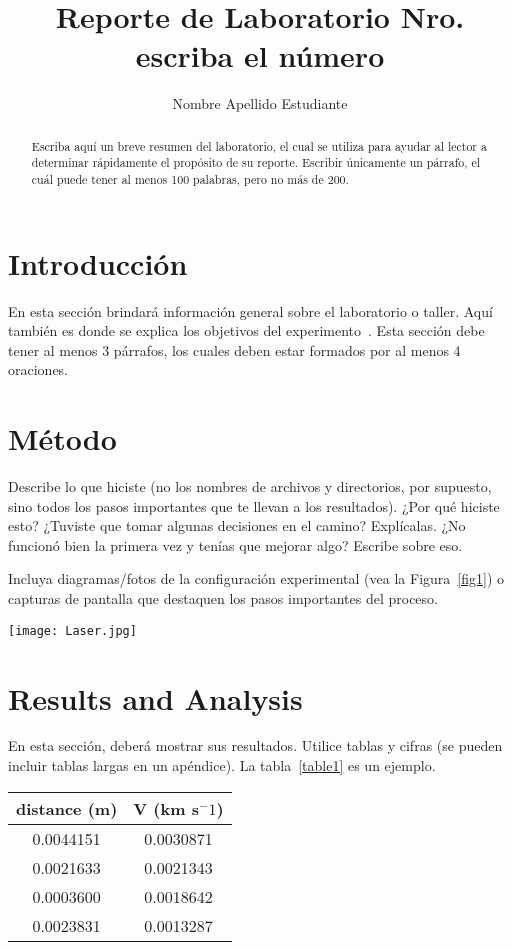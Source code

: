 \documentclass[10pt, oneside,spanish]{article}   	%
\title{Reporte de Laboratorio Nro. escriba el número}
\author[IDEstudiante]{Nombre Apellido Estudiante}
\affil[ ]{Universidad de las Fuerzas Armadas}
\affil[ ]{email@dominio.ec}
\affil[ ]{}
\affil[ ]{Tema: Tema de Laboratorio}
\date{}							%
\begin{document}
\maketitle

\begin{abstract}
Escriba aquí un breve resumen del laboratorio, el cual se utiliza para ayudar al lector a determinar rápidamente el propósito de su reporte. Escribir únicamente un párrafo, el cuál puede tener al menos 100 palabras, pero no más de 200.
\end{abstract}

\section{Introducción}
En esta sección brindará información general sobre el laboratorio o taller. Aquí también es donde se explica los objetivos del experimento~\cite{fest1959}. Esta sección debe tener al menos 3 párrafos, los cuales deben estar formados por al menos 4 oraciones.

\section {Método}
Describe lo que hiciste (no los nombres de archivos y directorios, por supuesto, sino todos los pasos importantes que te llevan a los resultados). ¿Por qué hiciste esto? ¿Tuviste que tomar algunas decisiones en el camino? Explícalas. ¿No funcionó bien la primera vez y tenías que mejorar algo? Escribe sobre eso.

Incluya diagramas/fotos de la configuración experimental (vea la Figura~\ref{fig1}) o capturas de pantalla que destaquen los pasos importantes del proceso.

\begin{figure*}[!ht] 
        \centering \texttt{[image: Laser.jpg]}
        \caption{\label{fig1}Every figure MUST have a caption~\cite{fest1959}.
        }
\end{figure*}

\section{Results and Analysis}
En esta sección, deberá mostrar sus resultados. Utilice tablas y cifras (se pueden incluir tablas largas en un apéndice). La tabla~\ref{table1} es un ejemplo.

\begin{table*}[ht]
\begin{center}
\caption{Cada tabla necesita una leyenda.}
\label{table1} 
\begin{tabular}{cc} 
\hline
\multicolumn{1}{c}{distance (m)} & \multicolumn{1}{c}{V (km s$^-1$)} \\
\hline
0.0044151 &   0.0030871 \\
0.0021633 &   0.0021343 \\
0.0003600 &   0.0018642 \\
0.0023831 &   0.0013287 \\
\hline
\end{tabular}
\end{center}
\end{table*}
\end{document}

